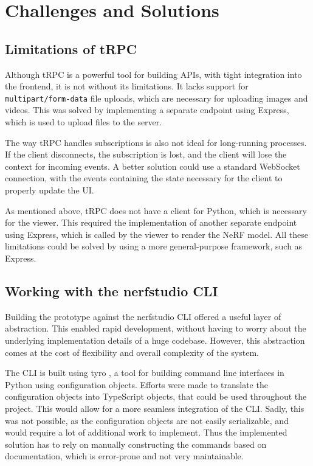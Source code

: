 \section{Challenges and Solutions}
\label{sec:system:challenges}

\subsection*{Limitations of tRPC}

Although tRPC is a powerful tool for building APIs, with tight integration into the frontend, it is not without its limitations.
It lacks support for \texttt{multipart/form-data} file uploads, which are necessary for uploading images and videos.
This was solved by implementing a separate endpoint using Express, which is used to upload files to the server.

The way tRPC handles subscriptions is also not ideal for long-running processes.
If the client disconnects, the subscription is lost, and the client will lose the context for incoming events.
A better solution could use a standard WebSocket connection, with the events containing the state necessary for the client to properly update the UI.

As mentioned above, tRPC does not have a client for Python, which is necessary for the viewer.
This required the implementation of another separate endpoint using Express, which is called by the viewer to render the NeRF model.
All these limitations could be solved by using a more general-purpose framework, such as Express.

\subsection*{Working with the nerfstudio CLI}

Building the prototype against the nerfstudio CLI offered a useful layer of abstraction.
This enabled rapid development, without having to worry about the underlying implementation details of a huge codebase.
However, this abstraction comes at the cost of flexibility and overall complexity of the system.

The CLI is built using tyro \cite{yi_brentyityro_2024}, a tool for building command line interfaces in Python using configuration objects.
Efforts were made to translate the configuration objects into TypeScript objects, that could be used throughout the project.
This would allow for a more seamless integration of the CLI.
Sadly, this was not possible, as the configuration objects are not easily serializable, and would require a lot of additional work to implement.
Thus the implemented solution has to rely on manually constructing the commands based on documentation, which is error-prone and not very maintainable.

